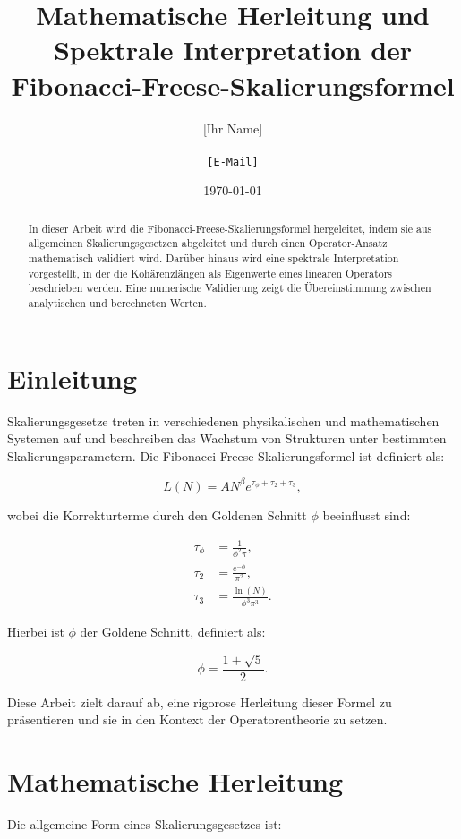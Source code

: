 \documentclass[a4paper,12pt]{article}
\title{Mathematische Herleitung und Spektrale Interpretation der Fibonacci-Freese-Skalierungsformel}
\author{[Ihr Name] \\ [Institution] \\ \texttt{[E-Mail]}}
\date{\today}
\begin{document}
\maketitle

\begin{abstract}
In dieser Arbeit wird die Fibonacci-Freese-Skalierungsformel hergeleitet, indem sie aus allgemeinen Skalierungsgesetzen abgeleitet und durch einen Operator-Ansatz mathematisch validiert wird. Darüber hinaus wird eine spektrale Interpretation vorgestellt, in der die Kohärenzlängen als Eigenwerte eines linearen Operators beschrieben werden. Eine numerische Validierung zeigt die Übereinstimmung zwischen analytischen und berechneten Werten.
\end{abstract}

\section{Einleitung}
Skalierungsgesetze treten in verschiedenen physikalischen und mathematischen Systemen auf und beschreiben das Wachstum von Strukturen unter bestimmten Skalierungsparametern. Die Fibonacci-Freese-Skalierungsformel ist definiert als:

\begin{equation}
    L(N) = A N^\beta e^{\tau_{\phi} + \tau_2 + \tau_3},
\end{equation}

wobei die Korrekturterme durch den Goldenen Schnitt \( \phi \) beeinflusst sind:

\begin{align}
    \tau_{\phi} &= \frac{1}{\phi^2 \pi}, \\
    \tau_2 &= \frac{e^{-\phi}}{\pi^2}, \\
    \tau_3 &= \frac{\ln(N)}{\phi^3 \pi^3}.
\end{align}

Hierbei ist \( \phi \) der Goldene Schnitt, definiert als:

\begin{equation}
    \phi = \frac{1+\sqrt{5}}{2}.
\end{equation}

Diese Arbeit zielt darauf ab, eine rigorose Herleitung dieser Formel zu präsentieren und sie in den Kontext der Operatorentheorie zu setzen.

\section{Mathematische Herleitung}
Die allgemeine Form eines Skalierungsgesetzes ist:
\end{document}
